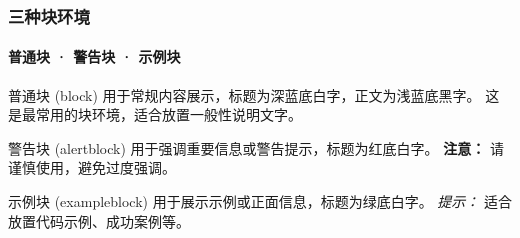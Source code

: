 \begin{frame}
\frametitle{三种块环境}
\framesubtitle{普通块 · 警告块 · 示例块}

\begin{block}{普通块 (block)}
用于常规内容展示，标题为深蓝底白字，正文为浅蓝底黑字。
这是最常用的块环境，适合放置一般性说明文字。
\end{block}

\begin{alertblock}{警告块 (alertblock)}
用于强调重要信息或警告提示，标题为红底白字。
\textbf{注意：} 请谨慎使用，避免过度强调。
\end{alertblock}

\begin{exampleblock}{示例块 (exampleblock)}
用于展示示例或正面信息，标题为绿底白字。
\textit{提示：} 适合放置代码示例、成功案例等。
\end{exampleblock}
\end{frame}
